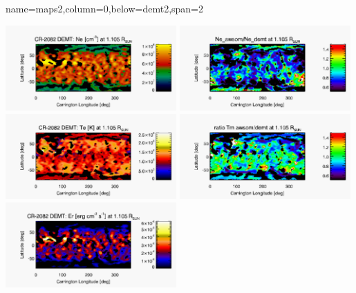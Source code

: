 \documentclass[paperwidth=100cm,paperheight=120cm]{baposter}
\def\azul#1{\textcolor{blue}{#1}}
\begin{document}
\begin{poster}
{{}
}

{name=maps2,column=0,below=demt2,span=2}{
\begin{center}
{\includegraphics[width=0.49\textwidth]{map_Ne_CR2082_DEMT-EUVI_behind_H1-L3523_r3d_1105_Rsun.pdf}}
{\includegraphics[width=0.49\textwidth]{map_ratio_Ne_awsom_2082_185_short-Ne_CR2082_DEMT-EUVI_behind_H1-L3523_r3d_1105_Rsun.pdf}}
{\includegraphics[width=0.49\textwidth]{map_Tm_CR2082_DEMT-EUVI_behind_H1-L3523_r3d_1105_Rsun.pdf}}
{\includegraphics[width=0.49\textwidth]{map_ratio_Te_awsom_2082_185_short-Tm_CR2082_DEMT-EUVI_behind_H1-L3523_r3d_1105_Rsun.pdf}}
{\includegraphics[width=0.49\textwidth]{map_Er_CR2082_DEMT-EUVI_behind_H1-L3523_r3d_1105_Rsun.pdf}}


\end{center}}
\end{poster}
\end{document}
